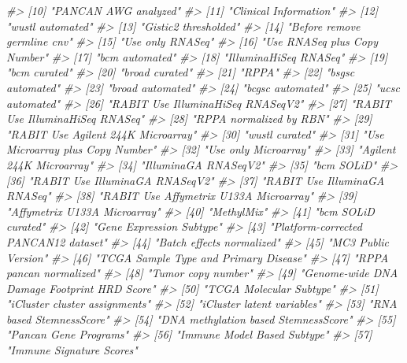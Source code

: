 \documentclass[nofonts,]{tufte-handout}
\newenvironment{Shaded}{\begin{snugshade}}{\end{snugshade}}
\newcommand{\CommentTok}[1]{\textcolor[rgb]{0.56,0.35,0.01}{\textit{#1}}}
\begin{document}
\begin{Shaded}
\begin{Highlighting}[]
\CommentTok{#> [10] "PANCAN AWG analyzed"                       }
\CommentTok{#> [11] "Clinical Information"                      }
\CommentTok{#> [12] "wustl automated"                           }
\CommentTok{#> [13] "Gistic2 thresholded"                       }
\CommentTok{#> [14] "Before remove germline cnv"                }
\CommentTok{#> [15] "Use only RNASeq"                           }
\CommentTok{#> [16] "Use RNASeq plus Copy Number"               }
\CommentTok{#> [17] "bcm automated"                             }
\CommentTok{#> [18] "IlluminaHiSeq RNASeq"                      }
\CommentTok{#> [19] "bcm curated"                               }
\CommentTok{#> [20] "broad curated"                             }
\CommentTok{#> [21] "RPPA"                                      }
\CommentTok{#> [22] "bsgsc automated"                           }
\CommentTok{#> [23] "broad automated"                           }
\CommentTok{#> [24] "bcgsc automated"                           }
\CommentTok{#> [25] "ucsc automated"                            }
\CommentTok{#> [26] "RABIT Use IlluminaHiSeq RNASeqV2"          }
\CommentTok{#> [27] "RABIT Use IlluminaHiSeq RNASeq"            }
\CommentTok{#> [28] "RPPA normalized by RBN"                    }
\CommentTok{#> [29] "RABIT Use Agilent 244K Microarray"         }
\CommentTok{#> [30] "wustl curated"                             }
\CommentTok{#> [31] "Use Microarray plus Copy Number"           }
\CommentTok{#> [32] "Use only Microarray"                       }
\CommentTok{#> [33] "Agilent 244K Microarray"                   }
\CommentTok{#> [34] "IlluminaGA RNASeqV2"                       }
\CommentTok{#> [35] "bcm SOLiD"                                 }
\CommentTok{#> [36] "RABIT Use IlluminaGA RNASeqV2"             }
\CommentTok{#> [37] "RABIT Use IlluminaGA RNASeq"               }
\CommentTok{#> [38] "RABIT Use Affymetrix U133A Microarray"     }
\CommentTok{#> [39] "Affymetrix U133A Microarray"               }
\CommentTok{#> [40] "MethylMix"                                 }
\CommentTok{#> [41] "bcm SOLiD curated"                         }
\CommentTok{#> [42] "Gene Expression Subtype"                   }
\CommentTok{#> [43] "Platform-corrected PANCAN12 dataset"       }
\CommentTok{#> [44] "Batch effects normalized"                  }
\CommentTok{#> [45] "MC3 Public Version"                        }
\CommentTok{#> [46] "TCGA Sample Type and Primary Disease"      }
\CommentTok{#> [47] "RPPA pancan normalized"                    }
\CommentTok{#> [48] "Tumor copy number"                         }
\CommentTok{#> [49] "Genome-wide DNA Damage Footprint HRD Score"}
\CommentTok{#> [50] "TCGA Molecular Subtype"                    }
\CommentTok{#> [51] "iCluster cluster assignments"              }
\CommentTok{#> [52] "iCluster latent variables"                 }
\CommentTok{#> [53] "RNA based StemnessScore"                   }
\CommentTok{#> [54] "DNA methylation based StemnessScore"       }
\CommentTok{#> [55] "Pancan Gene Programs"                      }
\CommentTok{#> [56] "Immune Model Based Subtype"                }
\CommentTok{#> [57] "Immune Signature Scores"}
\end{Highlighting}
\end{Shaded}
\end{document}
